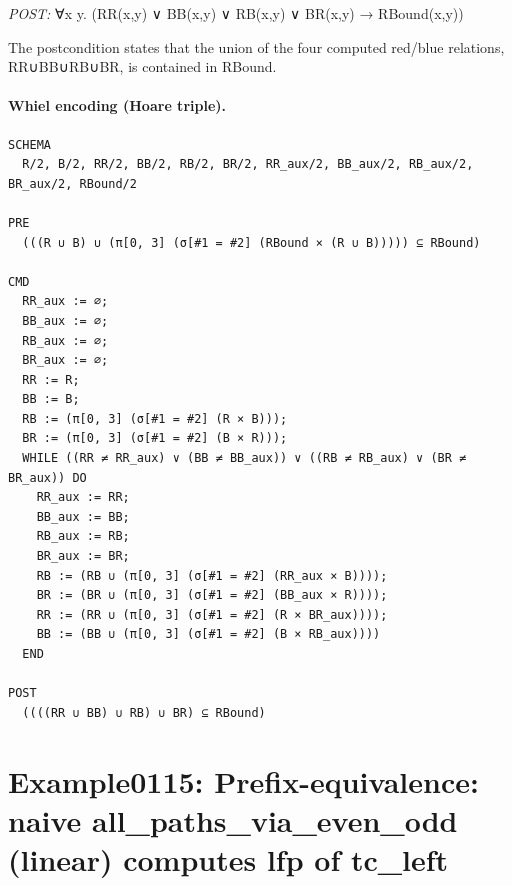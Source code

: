 \documentclass[10pt]{article}
\begin{document}
\textit{POST:} ∀x y. (RR(x,y) ∨ BB(x,y) ∨ RB(x,y) ∨ BR(x,y) → RBound(x,y))\par The postcondition states that the union of the four computed red/blue relations, RR∪BB∪RB∪BR, is contained in RBound.

\paragraph{Whiel encoding (Hoare triple).}

\begin{Verbatim}[fontsize=\scriptsize,breaklines=true,breakanywhere=true,frame=single,framesep=1.5mm]
SCHEMA
  R/2, B/2, RR/2, BB/2, RB/2, BR/2, RR_aux/2, BB_aux/2, RB_aux/2, BR_aux/2, RBound/2

PRE
  (((R ∪ B) ∪ (π[0, 3] (σ[#1 = #2] (RBound × (R ∪ B))))) ⊆ RBound)

CMD
  RR_aux := ∅;
  BB_aux := ∅;
  RB_aux := ∅;
  BR_aux := ∅;
  RR := R;
  BB := B;
  RB := (π[0, 3] (σ[#1 = #2] (R × B)));
  BR := (π[0, 3] (σ[#1 = #2] (B × R)));
  WHILE ((RR ≠ RR_aux) ∨ (BB ≠ BB_aux)) ∨ ((RB ≠ RB_aux) ∨ (BR ≠ BR_aux)) DO
    RR_aux := RR;
    BB_aux := BB;
    RB_aux := RB;
    BR_aux := BR;
    RB := (RB ∪ (π[0, 3] (σ[#1 = #2] (RR_aux × B))));
    BR := (BR ∪ (π[0, 3] (σ[#1 = #2] (BB_aux × R))));
    RR := (RR ∪ (π[0, 3] (σ[#1 = #2] (R × BR_aux))));
    BB := (BB ∪ (π[0, 3] (σ[#1 = #2] (B × RB_aux))))
  END

POST
  ((((RR ∪ BB) ∪ RB) ∪ BR) ⊆ RBound)
\end{Verbatim}

\Needspace{0.45\textheight}

\section{Example0115: Prefix-equivalence: naive all\_paths\_via\_even\_odd (linear) computes lfp of tc\_left}\label{case:Example0115}
\end{document}
